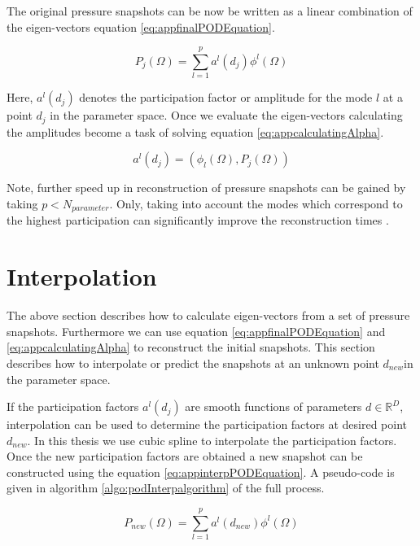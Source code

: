 The original pressure snapshots can be now be written as a linear combination of the eigen-vectors equation \ref{eq:appfinalPODEquation}.  

\begin{equation}\label{eq:appfinalPODEquation}
P_{j}(\Omega) = \sum_{l=1}^{p}a^{l}(d_{j}) \phi^{l}(\Omega)
\end{equation}

Here, \(a^{l}(d_{j})\) denotes the participation factor or amplitude for the mode \(l\) at a point \(d_{j}\) in the parameter space. Once we evaluate the eigen-vectors calculating the amplitudes become a task of solving equation \ref{eq:appcalculatingAlpha}. 

\begin{equation}\label{eq:appcalculatingAlpha}
a^{l}(d_{j}) = (\phi_{l}(\Omega) , P_{j}(\Omega))
\end{equation}

Note, further speed up in reconstruction of pressure snapshots can be gained by taking \(p < N_{parameter}\). Only, taking into account the modes which correspond to the highest participation can significantly improve the reconstruction times \cite{tan2003proper, allemang2011application}. 

\section{Interpolation}\label{subsec:interpolation}
The above section describes how to calculate eigen-vectors from a set of pressure snapshots. Furthermore we can use equation \ref{eq:appfinalPODEquation} and \ref{eq:appcalculatingAlpha} to reconstruct the initial snapshots. This section describes how to interpolate or predict the snapshots at an unknown point \(d_{new}\)in the parameter space. 

If the participation factors \(a^{l}(d_{j})\) are smooth functions of parameters \(d \in \mathbb{R}^D\), interpolation can be used to determine the participation factors at desired point \(d_{new}\). In this thesis we use cubic spline \cite{bartels1987introduction} to interpolate the participation factors. Once the new participation factors are obtained a new snapshot can be constructed using the equation \ref{eq:appinterpPODEquation}. A pseudo-code is given in algorithm \ref{algo:podInterpalgorithm} of the full process. 

\begin{equation}\label{eq:appinterpPODEquation}
P_{new}(\Omega) = \sum_{l=1}^{p}a^{l}(d_{new}) \phi^{l}(\Omega)
\end{equation}

